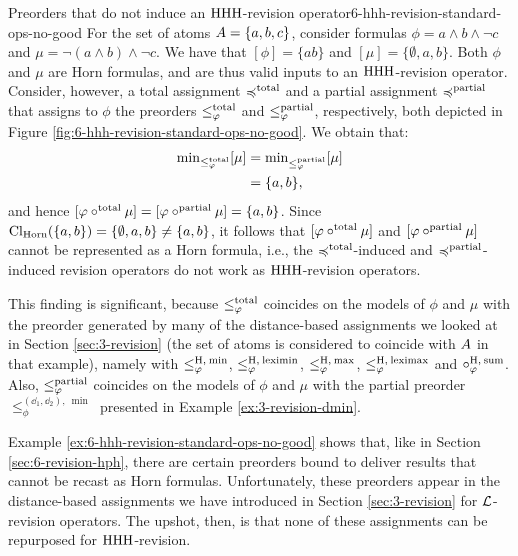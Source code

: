 \begin{xmpl}{Preorders that do not induce an ${\mathrm{HHH}}$-revision operator}{6-hhh-revision-standard-ops-no-good}
	For the set of atoms $A=\{a,b,c\}$,
	consider formulas $\phi=a\land b\land\lnot c$
	and $\mu=\lnot (a\land b)\land\lnot c$.
	We have that $[\phi]=\{ab\}$ and
	$[\mu]=\{\emptyset,a,b\}$.
	Both $\phi$ and $\mu$ are Horn formulas,
	and are thus valid inputs to an ${\mathrm{HHH}}$-revision operator.
	Consider, however, a total assignment $\preccurlyeq^{\mathrm{total}}$
	and a partial assignment $\preccurlyeq^{\mathrm{partial}}$
	that assigns to $\phi$ 
	the preorders
	$\le^{\mathrm{total}}_{\varphi}$ and  $\le^{\mathrm{partial}}_{\varphi}$,
	respectively,
	both depicted in Figure \ref{fig:6-hhh-revision-standard-ops-no-good}.
	We obtain that:
	\begin{align*}
		{\operatorname{min}}_{\le^{\mathrm{total}}_{\varphi}}[\mu] &={\operatorname{min}}_{\le^{\mathrm{partial}}_{\varphi}}[\mu]\\
											&= \{a,b\},	
	\end{align*}
	and hence $[\varphi\circ^{\mathrm{total}}\mu]=[\varphi\circ^{\mathrm{partial}}\mu]=\{a,b\}$.
	Since ${\operatorname{Cl}}_{\mathrm{Horn}}(\{a,b\})=\{\emptyset,a,b\}\neq\{a,b\}$,
	it follows that 
	$[\varphi\circ^{\mathrm{total}}\mu]$ and $[\varphi\circ^{\mathrm{partial}}\mu]$ 
	cannot be represented as a Horn formula,
	i.e., the $\preccurlyeq^{\mathrm{total}}$-induced and $\preccurlyeq^{\mathrm{partial}}$-induced
	revision operators do not work as 
	${\mathrm{HHH}}$-revision operators.

	This finding is significant,
	because $\le^{\mathrm{total}}_{\varphi}$
	coincides on the models of $\phi$ and $\mu$ 
	with the preorder generated 
	by many of the distance-based
	assignments we looked at in Section \ref{sec:3-revision}
	(the set of atoms is considered to coincide with $A$ in that example),
	namely with 
	$\le^{{\operatorname{H}},\:{\operatorname{min}}}_{\varphi}$,
	$\le^{{\operatorname{H}},\:{\operatorname{leximin}}}_{\varphi}$,
	$\le^{{\operatorname{H}},\:{\operatorname{max}}}_{\varphi}$,
	$\le^{{\operatorname{H}},\:{\operatorname{leximax}}}_{\varphi}$
	and
	$\circ^{{\operatorname{H}},\:{\operatorname{sum}}}_{\varphi}$.
	Also, $\le^{\mathrm{partial}}_{\varphi}$
	coincides on the models of $\phi$ and $\mu$
	with the partial preorder $\le^{(\dd_{1},\dd_{2}),\:\min}_{\phi}$
	presented in Example \ref{ex:3-revision-dmin}.
\end{xmpl}

Example \ref{ex:6-hhh-revision-standard-ops-no-good}
shows that, like in Section \ref{sec:6-revision-hph},
there are certain preorders bound to deliver results 
that cannot be recast as Horn formulas.
Unfortunately, these preorders appear in
the distance-based assignments we have introduced
in Section \ref{sec:3-revision} for $\mathcal{L}$-revision operators.
The upshot, then, is that none of these assignments
can be repurposed for ${\mathrm{HHH}}$-revision.

